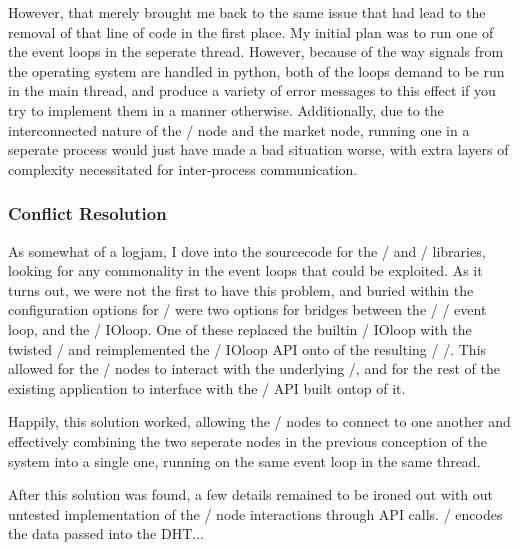 \documentclass[11pt,twocolumn]{article}
\begin{document}
However, that merely brought me back to the same issue that had lead to the removal of that line of code in the first place.
My initial plan was to run one of the event loops in the seperate thread.
However, because of the way signals from the operating system are handled in python, both of the loops demand to be run in the main thread, and produce a variety of error messages to this effect if you try to implement them in a manner otherwise.
Additionally, due to the interconnected nature of the \Entangled/ node and the market node, running one in a seperate process would just have made a bad situation worse, with extra layers of complexity necessitated for inter-process communication.

\subsubsection{Conflict Resolution}
As somewhat of a logjam, I dove into the sourcecode for the \Tornado/ and \Twisted/ libraries, looking for any commonality in the event loops that could be exploited. As it turns out, we were not the first to have this problem, and buried within the configuration options for \Tornado/ were two options for bridges between the \Twisted/ \reactor/ event loop, and the \Tornado/ IOloop. One of these replaced the builtin \Tornado/ IOloop with the twisted \reactor/ and reimplemented the \Tornado/ IOloop API onto of the resulting \Twisted/ \reactor/. This allowed for the \Entangled/ nodes to interact with the underlying \reactor/, and for the rest of the existing application to interface with the \Tornado/ API built ontop of it.

Happily, this solution worked, allowing the \Entangled/ nodes to connect to one another and effectively combining the two seperate nodes in the previous conception of the system into a single one, running on the same event loop in the same thread.

After this solution was found, a few details remained to be ironed out with out untested implementation of the \Entangled/ node interactions through API calls. \Entangled/ encodes the data passed into the DHT...






\end{document}
